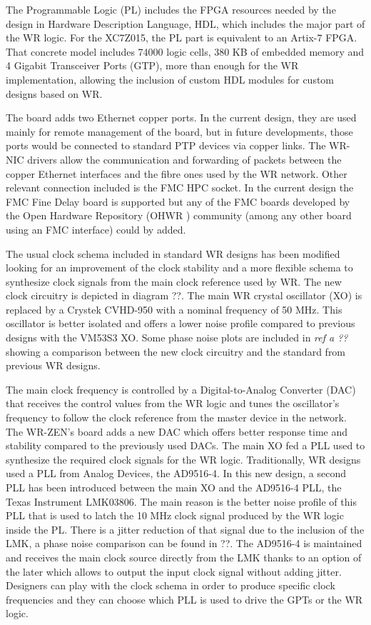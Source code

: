 The Programmable Logic (PL) includes the FPGA resources needed 
by the design in Hardware Description Language, HDL, which includes the major part of the WR logic. For the XC7Z015, the PL part is equivalent to an Artix-7 FPGA. That concrete model includes 74000 logic cells, 380 KB of embedded memory and 4 Gigabit Transceiver Ports (GTP), more than enough for the WR implementation, allowing the inclusion of custom HDL modules for custom designs based on WR.

The board adds two Ethernet copper ports. In the current design, they are used mainly for remote management of the board, but in future developments, those ports would be connected to standard PTP devices via copper links. The WR-NIC drivers allow the communication and forwarding of packets between the copper Ethernet interfaces and the fibre ones used by the WR network. Other relevant connection included is the FMC HPC socket. In the current design the FMC Fine Delay board 
is supported but any of the FMC boards developed by the Open Hardware 
Repository (OHWR \cite{ohwr:repo}) community (among any other board using an FMC interface) could by added.

The usual clock schema included in standard WR designs has been modified looking for an improvement of the clock stability and a more flexible schema to synthesize clock signals from the main clock reference used by WR. The new clock circuitry is depicted in diagram ??. The main WR crystal oscillator (XO) is replaced by a Crystek CVHD-950 with a nominal frequency of 50 MHz. This oscillator is better isolated and offers a lower noise profile compared to previous designs with the VM53S3 XO. Some phase noise plots are included in  \textit{ref a ??} showing a comparison between the new clock circuitry and the standard from previous WR designs.

The main clock frequency is controlled by a Digital-to-Analog Converter (DAC) that receives the control values from the WR logic and tunes the oscillator's frequency to follow the clock reference from the master device in the network. The WR-ZEN's board adds a new DAC which offers better response time and stability compared to the previously used DACs. The main XO fed a PLL used to synthesize the required clock signals for the WR logic. Traditionally, WR designs used a PLL from Analog Devices, the AD9516-4. In this new design, a second PLL has been introduced between the main XO and the AD9516-4 PLL, the Texas Instrument LMK03806. The main reason is the better noise profile of this PLL that is used to latch the 10 MHz clock signal produced by the WR logic inside the PL. There is a jitter reduction of that signal due to the inclusion of the LMK, a phase noise comparison can be found in ??. The AD9516-4 is maintained and receives the main clock source directly from the LMK thanks to an option of the later which allows to output the input clock signal without adding jitter. Designers can play with the clock schema in order to produce specific clock frequencies and they can choose which PLL is used to drive the GPTs or the WR logic.


